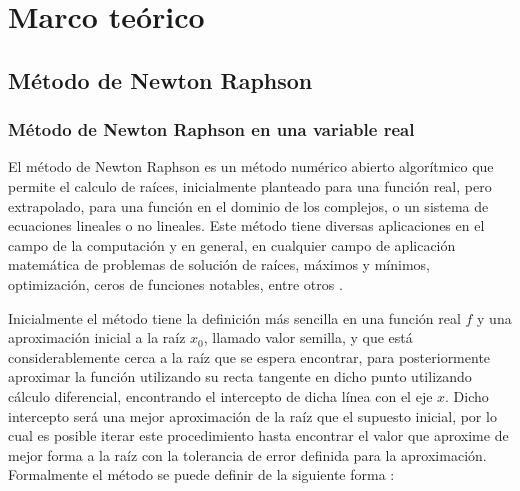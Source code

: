 \documentclass[12pt]{article}
\begin{document}
\section{Marco teórico}
\subsection{Método de Newton Raphson}
\subsubsection{Método de Newton Raphson en una variable real}
El método de Newton Raphson es un método numérico abierto algorítmico que permite el calculo de raíces, inicialmente planteado para una función real, pero extrapolado, para una función en el dominio de los complejos, o un sistema de ecuaciones lineales o no lineales. Este método tiene diversas aplicaciones en el campo de la computación y en general, en cualquier campo de aplicación matemática de problemas de solución de raíces, máximos y mínimos, optimización, ceros de funciones notables, entre otros \cite{chapra}.

Inicialmente el método tiene la definición más sencilla en una función real $f$ y una aproximación inicial a la raíz $x_0$, llamado valor semilla, y que está considerablemente cerca a la raíz que se espera encontrar, para posteriormente aproximar la función utilizando su recta tangente en dicho punto utilizando cálculo diferencial, encontrando el intercepto de dicha línea con el eje $x$. Dicho intercepto será una mejor aproximación de la raíz que el supuesto inicial, por lo cual es posible iterar este procedimiento hasta encontrar el valor que aproxime de mejor forma a la raíz con la tolerancia de error definida para la aproximación. Formalmente el método se puede definir de la siguiente forma \cite{chapra}:
\end{document}
